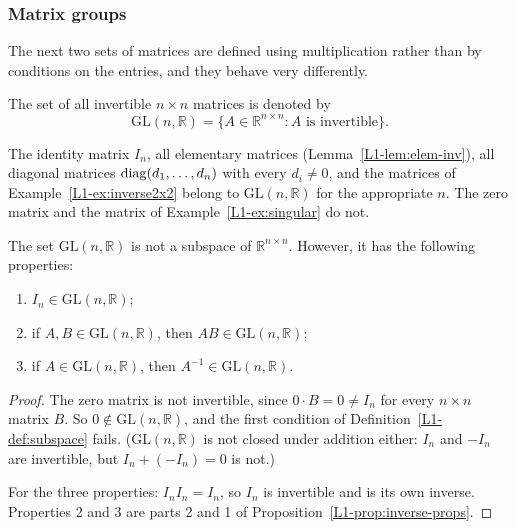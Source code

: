 \subsubsection{Matrix groups}

The next two sets of matrices are defined using multiplication rather than by conditions on the entries, and they behave very differently.

\begin{definition}
    The set of all invertible $n \times n$ matrices is denoted by
    \[\mathrm{GL}(n, \mathbb{R}) = \{A \in \mathbb{R}^{n \times n} : A \text{ is invertible}\}.\]
\end{definition}

\begin{example}
    The identity matrix $I_n$, all elementary matrices (Lemma~\ref{L1-lem:elem-inv}), all diagonal matrices $\operatorname{diag}(d_1, \ldots, d_n)$ with every $d_i \neq 0$, and the matrices of Example~\ref{L1-ex:inverse2x2} belong to $\mathrm{GL}(n, \mathbb{R})$ for the appropriate $n$. The zero matrix and the matrix of Example~\ref{L1-ex:singular} do not.
\end{example}

\begin{proposition}\label{L1-prop:GL}
    The set $\mathrm{GL}(n, \mathbb{R})$ is not a subspace of $\mathbb{R}^{n \times n}$. However, it has the following properties:
    \begin{enumerate}
        \item $I_n \in \mathrm{GL}(n, \mathbb{R})$;
        \item if $A, B \in \mathrm{GL}(n, \mathbb{R})$, then $AB \in \mathrm{GL}(n, \mathbb{R})$;
        \item if $A \in \mathrm{GL}(n, \mathbb{R})$, then $A^{-1} \in \mathrm{GL}(n, \mathbb{R})$.
    \end{enumerate}
\end{proposition}

\begin{proof}
    The zero matrix is not invertible, since $0 \cdot B = 0 \neq I_n$ for every $n \times n$ matrix $B$. So $0 \notin \mathrm{GL}(n, \mathbb{R})$, and the first condition of Definition~\ref{L1-def:subspace} fails. ($\mathrm{GL}(n, \mathbb{R})$ is not closed under addition either: $I_n$ and $-I_n$ are invertible, but $I_n + (-I_n) = 0$ is not.)

    For the three properties: $I_n I_n = I_n$, so $I_n$ is invertible and is its own inverse. Properties 2 and 3 are parts 2 and 1 of Proposition~\ref{L1-prop:inverse-props}.
\end{proof}

